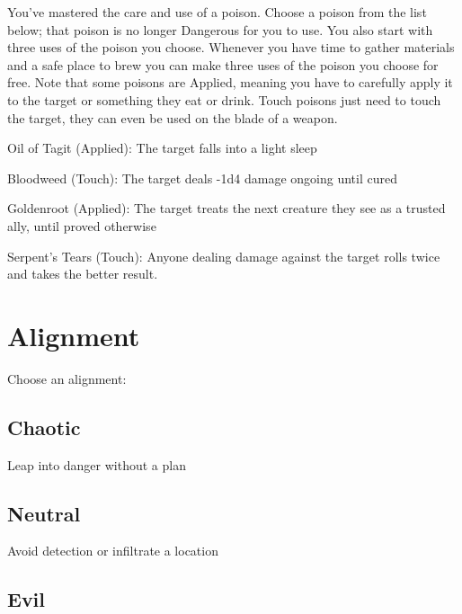 You've mastered the care and use of a poison. Choose a poison from the list below; that poison is no longer Dangerous for you to use. You also start with three uses of the poison you choose. Whenever you have time to gather materials and a safe place to brew you can make three uses of the poison you choose for free. Note that some poisons are Applied, meaning you have to carefully apply it to the target or something they eat or drink. Touch poisons just need to touch the target, they can even be used on the blade of a weapon.

 
\startitemize[1,packed]

\item Oil of Tagit (Applied): The target falls into a light sleep

 
\item Bloodweed (Touch): The target deals -1d4 damage ongoing until cured

 
\item Goldenroot (Applied): The target treats the next creature they see as a trusted ally, until proved otherwise

 
\item Serpent's Tears (Touch): Anyone dealing damage against the target rolls twice and takes the better result.


\stopitemize




 
\section{Alignment}   
 
\startInstructionsAfterHeader
Choose an alignment:
\stopInstructionsAfterHeader
 


\subsection{Chaotic}   
 

Leap into danger without a plan

 
\subsection{Neutral}   
 

Avoid detection or infiltrate a location

 
\subsection{Evil}   
 

